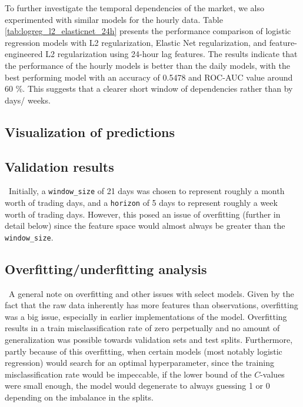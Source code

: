 \documentclass[11pt]{article}
\begin{document}

\FloatBarrier

To further investigate the temporal dependencies of the market, we also experimented with similar models for the hourly data. Table \ref{tab:logreg_l2_elasticnet_24h} presents the performance comparison of logistic regression models with L2 regularization, Elastic Net regularization, and feature-engineered L2 regularization using 24-hour lag features. The results indicate that the performance of the hourly models is better than the daily models, with the best performing model  with an accuracy of 0.5478 and ROC-AUC value around 60 \%. This suggests that a clearer short window of dependencies rather than by days/ weeks.

\subsection{Visualization of predictions}

\subsection{Validation results}
\quad \ Initially, a \verb|window_size| of 21 days was chosen to represent roughly a month worth of trading days, and a \verb|horizon| of 5 days to represent roughly a week worth of trading days. However, this posed an issue of overfitting (further in detail below) since the feature space would almost always be greater than the \verb|window_size|.

\subsection{Overfitting/underfitting analysis}


\quad \ A general note on overfitting and other issues with select models. Given by the fact that the raw data inherently has more features than observations, overfitting was a big issue, especially in earlier implementations of the model. Overfitting results in a train misclassification rate of zero perpetually and no amount of generalization was possible towards validation sets and test splits. Furthermore, partly because of this overfitting, when certain models (most notably logistic regression) would search for an optimal hyperparameter, since the training misclassification rate would be impeccable, if the lower bound of the $C$-values were small enough, the model would degenerate to always guessing 1 or 0 depending on the imbalance in the splits. 
\end{document}
